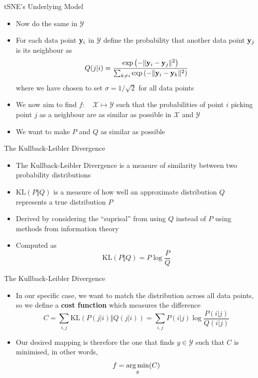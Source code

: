 \documentclass[aspectratio=169]{beamer}
\begin{document}
\begin{frame}{tSNE's Underlying Model}
  \begin{itemize}
    \item Now do the same in $\mathcal{Y}$
    \item For each data point $\mathbf{y}_i$ in  $\mathcal{Y}$ define the probability that another data point $\mathbf{y}_j$ is its neighbour as 
    \begin{equation*}
      Q(j\vert i) = \frac{\exp\left(-\|\mathbf{y}_i-\mathbf{y}_j\|^2\right)}{\sum_{k\ne i}\exp\left(-\|\mathbf{y}_i-\mathbf{y}_k\|^2\right)}
    \end{equation*}
    where we have chosen to set $\sigma=1/\sqrt{2}$ for all data points
    \pause
    \item We now aim to find $f:\quad \mathcal{X}\mapsto\mathcal{Y}$ such that the probabilities of point $i$ picking point $j$ as a neighbour are as similar as possible in $\mathcal{X}$ and $\mathcal{Y}$
    \pause
    \item We want to make $P$ and $Q$ as similar as possible
  \end{itemize}
\end{frame}

\begin{frame}{The Kullback-Leibler Divergence}
  \begin{itemize}
    \item The Kullback-Leibler Divergence is a measure of similarity between two probability distributions
    \item $\mathrm{KL}(P\Vert Q)$ is a measure of how well an approximate distribution $Q$ represents a true distribution $P$
    \item Derived by considering the ``suprisal'' from using $Q$ instead of $P$ using methods from information theory
    \item Computed as
    \begin{equation*}
      \mathrm{KL}(P\Vert Q) = P\log\frac{P}{Q}
    \end{equation*}
  \end{itemize}
\end{frame}

\begin{frame}{The Kullback-Leibler Divergence}
  \begin{itemize}
    \item In our specific case, we want to match the distribution across all data points, so we define a \textbf{cost function} which measures the difference
    \begin{equation*}
      C = \sum_{i,j}\mathrm{KL}(P(j\vert i)\Vert Q(j\vert i)) = \sum_{i,j} P(i\vert j)\log\frac{P(i\vert j)}{Q(i\vert j)}
    \end{equation*}
    \item Our desired mapping is therefore the one that finds $y\in\mathcal{Y}$ such that $C$ is minimised, in other words,
    \begin{equation*}
      f = \operatorname*{arg\,min}_y(C)
    \end{equation*}   
  \end{itemize}
\end{frame}
\end{document}

